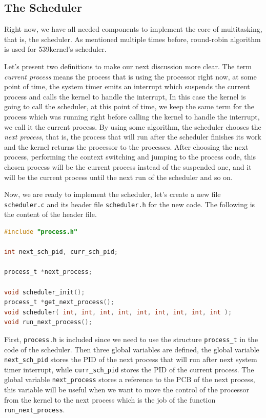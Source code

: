 \subsection{The Scheduler}\label{the-scheduler}

Right now, we have all needed components to implement the core of
multitasking, that is, the scheduler. As mentioned multiple times
before, round-robin algorithm is used for 539kernel's scheduler.

Let's present two definitions to make our next discussion more clear.
The term \emph{current process} means the process that is using the
processor right now, at some point of time, the system timer emits an
interrupt which suspends the current process and calls the kernel to
handle the interrupt, In this case the kernel is going to call the
scheduler, at this point of time, we keep the same term for the process
which was running right before calling the kernel to handle the
interrupt, we call it the current process. By using some algorithm, the
scheduler chooses the \emph{next process}, that is, the process that
will run after the scheduler finishes its work and the kernel returns
the processor to the processes. After choosing the next process,
performing the context switching and jumping to the process code, this
chosen process will be the current process instead of the suspended one,
and it will be the current process until the next run of the scheduler
and so on.

Now, we are ready to implement the scheduler, let's create a new file
\lstinline!scheduler.c! and its header file \lstinline!scheduler.h! for
the new code. The following is the content of the header file.

\begin{lstlisting}[language=C]
#include "process.h"

int next_sch_pid, curr_sch_pid;

process_t *next_process;

void scheduler_init();
process_t *get_next_process();
void scheduler( int, int, int, int, int, int, int, int, int );
void run_next_process();
\end{lstlisting}

First, \lstinline!process.h! is included since we need to use the
structure \lstinline!process_t! in the code of the scheduler. Then three
global variables are defined, the global variable
\lstinline!next_sch_pid! stores the PID of the next process that will
run after next system timer interrupt, while \lstinline!curr_sch_pid!
stores the PID of the current process. The global variable
\lstinline!next_process! stores a reference to the PCB of the next
process, this variable will be useful when we want to move the control
of the processor from the kernel to the next process which is the job of
the function \lstinline!run_next_process!.

